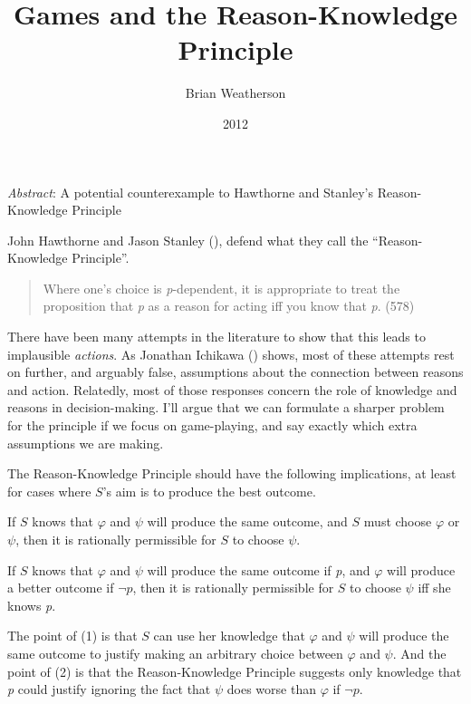 \documentclass[
  11pt,
  letterpaper,
  DIV=11,
  numbers=noendperiod,
  twoside]{scrartcl}
\title{Games and the Reason-Knowledge Principle}
\author{Brian Weatherson}
\date{2012}
\providecommand{\tightlist}{%
  \setlength{\itemsep}{0pt}\setlength{\parskip}{0pt}}
\renewenvironment{abstract}
 {\vspace{-1.25cm}
 \quotation\small\noindent\emph{Abstract}:}
 {\endquotation}
\renewenvironment{abstract}
 {\quotation\small\noindent\emph{Abstract}:}
 {\endquotation\vspace{-0.02cm}}
\begin{document}
\maketitle
\begin{abstract}
A potential counterexample to Hawthorne and Stanley's Reason-Knowledge
Principle
\end{abstract}


John Hawthorne and Jason Stanley
(), defend what they call the
``Reason-Knowledge Principle''.

\begin{quote}
Where one's choice is \emph{p}-dependent, it is appropriate to treat the
proposition that \emph{p} as a reason for acting iff you know that
\emph{p}. (578)
\end{quote}

There have been many attempts in the literature to show that this leads
to implausible \emph{actions}. As Jonathan Ichikawa
() shows, most of these attempts rest
on further, and arguably false, assumptions about the connection between
reasons and action. Relatedly, most of those responses concern the role
of knowledge and reasons in decision-making. I'll argue that we can
formulate a sharper problem for the principle if we focus on
game-playing, and say exactly which extra assumptions we are making.

The Reason-Knowledge Principle should have the following implications,
at least for cases where \(S\)'s aim is to produce the best outcome.

\begin{description}
\tightlist
\item[(1)]
If \(S\) knows that \(\varphi\) and \(\psi\) will produce the same
outcome, and \(S\) must choose \(\varphi\) or \(\psi\), then it is
rationally permissible for \(S\) to choose \(\psi\).
\item[(2)]
If \(S\) knows that \(\varphi\) and \(\psi\) will produce the same
outcome if \emph{p}, and \(\varphi\) will produce a better outcome if
\(\neg p\), then it is rationally permissible for \(S\) to choose
\(\psi\) iff she knows \emph{p}.
\end{description}

The point of (1) is that \(S\) can use her knowledge that \(\varphi\)
and \(\psi\) will produce the same outcome to justify making an
arbitrary choice between \(\varphi\) and \(\psi\). And the point of (2)
is that the Reason-Knowledge Principle suggests only knowledge that
\emph{p} could justify ignoring the fact that \(\psi\) does worse than
\(\varphi\) if \(\neg p\).
\end{document}

